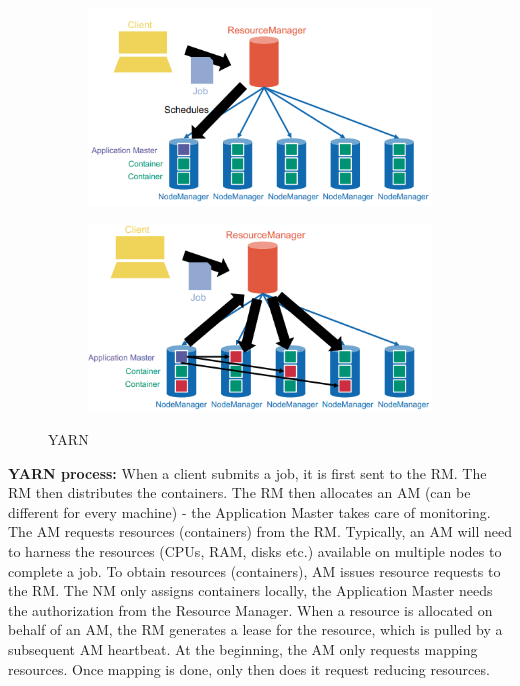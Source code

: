 \documentclass[11pt,oneside,a4paper]{article}
\begin{document}
\begin{figure}[hb!]
	\centering
	\begin{subfigure}[t]{.5\textwidth}
		\centering
		\includegraphics[width=0.8\linewidth]{figures/yarn_1}
		\label{fig:yarn1}
	\end{subfigure}%
	\begin{subfigure}[t]{.5\textwidth}
		\centering
		\includegraphics[width=0.8\linewidth]{figures/yarn_2}
		\label{fig:yarn2}
	\end{subfigure}
	\caption{YARN}
\end{figure}

\textbf{YARN process:} When a client submits a job, it is first sent to the RM. The RM then distributes the containers. The RM then allocates an AM (can be different for every machine) - the Application Master takes care of monitoring. The AM requests resources (containers) from the RM. Typically, an AM will need to harness the resources (CPUs, RAM, disks etc.) available on multiple nodes to complete a job. To obtain resources (containers), AM issues resource requests to the RM.  The NM only assigns containers locally, the Application Master needs the authorization from the Resource Manager. When a resource is allocated on behalf of an AM, the RM generates a lease for the resource, which is pulled by a subsequent AM
heartbeat.  At the beginning, the AM only requests mapping resources. Once mapping is done, only then does it request reducing resources.
\end{document}
